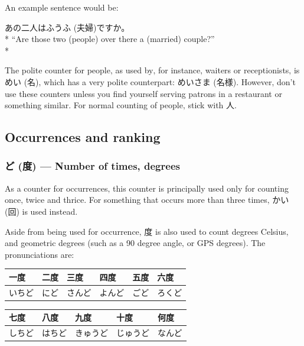 \documentclass[11pt, b5paper, twoside, openright, onecolumn]{book}
\makeatletter
\newcommand*{\rubystack}[2]{{\relscale{0.5}%
  \begin{tabular}[b]{@{}c@{}}%
    {#1}\\%
   {\textscale{2}{#2}}%
  \end{tabular}}%
}
\DeclareRobustCommand*{\ruby}[2]{%
  \mbox{%
    \setlength{\parskip}{0ex}%
    \BeginAccSupp{method=pdfstringdef,ActualText={#1}}%
      \rubystack{\phantom{#2}}{#1}%
      \llap{%
        \rubystack{#2}{\phantom{#1}}%
      }%
    \EndAccSupp{}%
  }%
}
\renewcommand*{\ruby}[2]{#2 (#1)}%
\newenvironment{exampleblock}{
\setlength{\parindent}{0.6in}
\begin{minipage}[t]{\dimexpr\textwidth-\parindent}}
{\end{minipage}}
\newenvironment{mytabular}[1]{\noindent\hspace{0.4in}
\begin{tabular}[h]{#1}}{\end{tabular}}
\makeatother
\begin{document}
An example sentence would be:

\vspace{0.4cm}
\begin{exampleblock}
あの二人は\ruby{夫婦}{ふうふ}ですか。 \\* 
“Are those two (people) over there a (married) couple?” \\* 
\end{exampleblock}
\vspace{0.2cm}

The polite counter for people‚ as used by‚ for instance‚ waiters or receptionists‚ is \ruby{名}{めい}‚ which has a very polite counterpart: \ruby{名様}{めいさま}. However‚ don’t use these counters unless you find yourself serving patrons in a restaurant or something similar. For normal counting of people‚ stick with 人.

\subsection{Occurrences and ranking}

\subsubsection{\ruby{度}{ど} — Number of times‚ degrees}

As a counter for occurrences‚ this counter is principally used only for counting once‚ twice and thrice. For something that occurs more than three times‚ \ruby{回}{かい} is used instead.

Aside from being used for occurrence‚ 度 is also used to count degrees Celsius‚ and geometric degrees (such as a 90 degree angle‚ or GPS degrees). The pronunciations are:

\vspace{0.5cm}
\smaller
\begin{mytabular}{| l  l  l  l  l  l |}\hline 
\rule{0pt}{2.4ex}一度 & 二度 & 三度 & 四度 & 五度 & 六度\\ 
\hline
\rule{0pt}{2.4ex}いちど & にど & さんど & よんど & ごど & ろくど\\ 
\hline 
\end{mytabular}
\larger
\vspace{0.5cm}

\smaller
\begin{mytabular}{| l  l  l  l  l |}\hline 
\rule{0pt}{2.4ex}七度 & 八度 & 九度 & 十度 & 何度\\ 
\hline
\rule{0pt}{2.4ex}しちど & はちど & きゅうど & じゅうど & なんど\\ 
\hline 
\end{mytabular}
\larger
\vspace{0.5cm}
\end{document}
